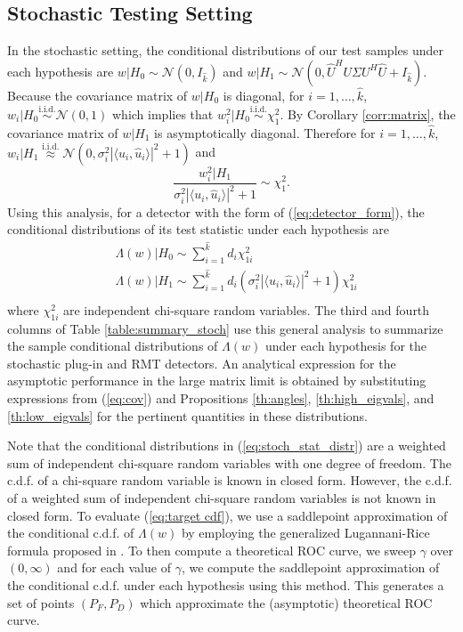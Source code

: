 \subsection{Stochastic Testing Setting}\label{sec:roc_stoch}
In the stochastic setting, the conditional distributions of our test samples under each hypothesis are $w|H_0\sim\mathcal{N}(0,I_{\widehat{k}})$ and $w|H_1\sim\mathcal{N}(0,\widehat{U}^HU\Sigma U^H\widehat{U}+I_{\widehat{k}})$. Because the covariance matrix of $w|H_0$ is diagonal, for $i=1,\dots,\widehat{k}$, $w_i|H_0\overset{\text{i.i.d}.}{\sim}\mathcal{N}(0,1)$ which implies that $w_i^2|H_0\overset{\text{i.i.d.}}{\sim}\chi_1^2$. By Corollary \ref{corr:matrix}, the covariance matrix of $w|H_1$ is asymptotically diagonal. Therefore for $i=1,\dots,\widehat{k}$, $w_i|H_1\overset{\text{i.i.d.}}{\approx}\mathcal{N}(0,\sigma^2_i|\langle u_i,\widehat{u}_i\rangle|^2+1)$ and
\begin{equation*}
\frac{w_i^2|H_1}{\sigma^2_i|\langle u_i,\widehat{u}_i\rangle|^2+1}\sim\chi_1^2.
\end{equation*}
Using this analysis, for a detector with the form of (\ref{eq:detector_form}), the conditional distributions of its test statistic under each hypothesis are
\begin{equation}\label{eq:stoch_stat_distr}
\begin{aligned}
&\Lambda(w)|H_0 \sim \sum_{i=1}^{\widehat{k}} d_i\chi_{1i}^2\\
&\Lambda(w)|H_1\sim\sum_{i=1}^{\widehat{k}}d_i(\sigma^2_i|\langle u_i,\widehat{u}_i\rangle|^2+1)\chi_{1i}^2\\
\end{aligned}
\end{equation}
where $\chi_{1i}^2$ are independent chi-square random variables. The third and fourth columns of Table \ref{table:summary_stoch} use this general analysis to summarize the sample conditional distributions of $\Lambda(w)$ under each hypothesis for the stochastic plug-in and RMT detectors.  An analytical expression for the asymptotic performance in the large matrix limit  is obtained by substituting expressions from (\ref{eq:cov}) and Propositions \ref{th:angles}, \ref{th:high_eigvals}, and \ref{th:low_eigvals} for the pertinent quantities in these distributions.

Note that the conditional distributions in (\ref{eq:stoch_stat_distr}) are a weighted sum of independent chi-square random variables with one degree of freedom. The c.d.f. of a chi-square random variable is known in closed form. However, the c.d.f. of a weighted sum of independent chi-square random variables is not known in closed form. To evaluate (\ref{eq:target cdf}), we use a saddlepoint approximation of the conditional c.d.f. of $\Lambda(w)$ by employing the generalized Lugannani-Rice formula proposed in \cite{wood1993saddlepoint}. To then compute a theoretical ROC curve, we sweep $\gamma$ over $(0,\infty)$ and for each value of $\gamma$, we compute the saddlepoint approximation of the conditional c.d.f. under each hypothesis using this method. This generates a set of points $(P_F,P_D)$ which approximate the (asymptotic) theoretical ROC curve.

